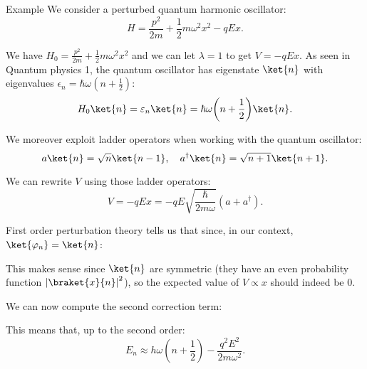 \documentclass[a4paper]{article}
\begin{document}
\begin{parag}{Example}
    We consider a perturbed quantum harmonic oscillator:  
    \[H = \frac{p^2}{2m} + \frac{1}{2} m \omega^2 x^2 - q E x.\]

    We have $H_0 = \frac{p^2}{2m} + \frac{1}{2} m \omega^2 x^2$ and we can let $\lambda = 1$ to get $V = -q E x$. As seen in Quantum physics 1, the quantum oscillator has eigenstate $\ket{n}$ with eigenvalues $\epsilon_n = \hbar \omega \left(n + \frac{1}{2}\right)$: 
    \[H_0 \ket{n} = \epsilon_n \ket{n} = \hbar \omega \left(n + \frac{1}{2}\right) \ket{n}.\]

    We moreover exploit ladder operators when working with the quantum oscillator: 
    \[a \ket{n} = \sqrt{n} \ket{n-1}, \mathspace a^{\dagger} \ket{n} = \sqrt{n+1} \ket{n+1}.\]

    We can rewrite $V$ using those ladder operators: 
    \[V = -q E x = -q E \sqrt{\frac{\hbar}{2 m \omega}} \left(a + a^{\dagger}\right).\]

    First order perturbation theory tells us that since, in our context, $\ket{\phi_n} = \ket{n}$: 

    This makes sense since $\ket{n}$ are symmetric (they have an even probability function $\left|\braket{x}{n}\right|^2$), so the expected value of $V \propto x$ should indeed be $0$. 

    We can now compute the second correction term: 

    This means that, up to the second order: 
    \[E_n \approx h \omega \left(n + \frac{1}{2}\right) - \frac{q^2 E^2}{2m \omega^2}.\]
    


\end{parag}
\end{document}
